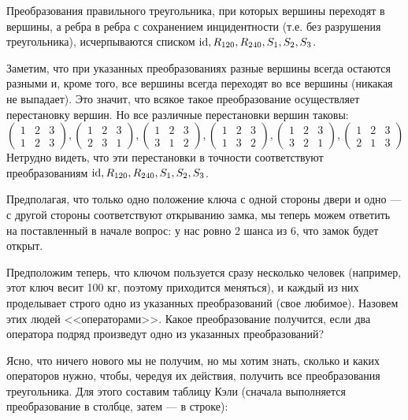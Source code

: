 \begin{thrm}
Преобразования правильного треугольника, при которых вершины переходят в вершины, а ребра в ребра с сохранением инцидентности (т.е. без разрушения треугольника), исчерпываются списком $\mathrm{id}, R_{120}, R_{240}, S_1, S_2, S_3$.
\end{thrm}
\pf
Заметим, что при указанных преобразованиях разные вершины всегда остаются разными и, кроме того, все вершины всегда переходят во все вершины (никакая не выпадает). Это значит, что всякое такое преобразование осуществляет перестановку вершин. Но все различные перестановки вершин таковы:
$$
\begin{pmatrix}
1 & 2 & 3 \\
1 & 2 & 3
\end{pmatrix},
\begin{pmatrix}
1 & 2 & 3 \\
2 & 3 & 1
\end{pmatrix},
\begin{pmatrix}
1 & 2 & 3 \\
3 & 1 & 2
\end{pmatrix},
\begin{pmatrix}
1 & 2 & 3 \\
1 & 3 & 2
\end{pmatrix},
\begin{pmatrix}
1 & 2 & 3 \\
3 & 2 & 1
\end{pmatrix},
\begin{pmatrix}
1 & 2 & 3 \\
2 & 1 & 3
\end{pmatrix}
$$
Нетрудно видеть, что эти перестановки в точности соответствуют преобразованиям $\mathrm{id}, R_{120}, R_{240}, S_1, S_2, S_3$.
\epf

Предполагая, что только одно положение ключа с одной стороны двери и одно --- с другой стороны соответствуют открыванию замка, мы теперь можем ответить на поставленный в начале вопрос: у нас ровно 2 шанса из 6, что замок будет открыт.

Предположим теперь, что ключом пользуется сразу несколько человек (например, этот ключ весит 100 кг, поэтому приходится меняться), и каждый из них проделывает строго одно из указанных преобразований (свое любимое). Назовем этих людей <<операторами>>. Какое преобразование получится, если два оператора подряд произведут одно из указанных преобразований?

Ясно, что ничего нового мы не получим, но мы хотим знать, сколько и каких операторов нужно, чтобы, чередуя их действия, получить все преобразования треугольника. Для этого составим таблицу Кэли (сначала выполняется преобразование в столбце, затем --- в строке):

